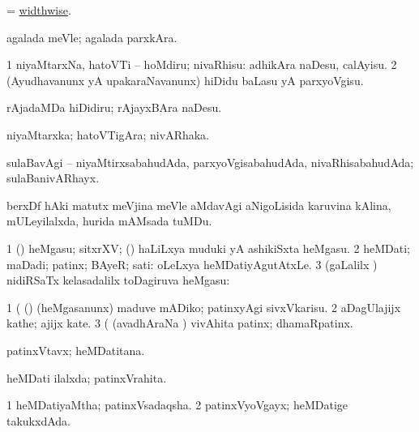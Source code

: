 \bentry
{}
\gl{\kirxvi}
\bmng
= \hyperlink{widthwise}{widthwise}. 
\emng
\eentry

\bentry
{}
\gl{\kirxvi}
\bmng
agalada meVle; agalada parxkAra. 
\emng
\eentry

\bentry
{}
\gl{\sakirx}
\bmng
\bnum
\num{1} niyaMtarxNa, hatoVTi -- hoMdiru; nivaRhisu:  adhikAra naDesu, calAyisu. 
\num{2} (Ayudhavanunx yA upakaraNavanunx) hiDidu baLasu yA parxyoVgisu. 
\enum
\emng

\noindent 
\gl{\pagu}
\bmng
{} rAjadaMDa hiDidiru; rAjayxBAra naDesu. 
\emng
\eentry

\bentry
{}
\gl{\nA}
\bmng
niyaMtarxka; hatoVTigAra; nivARhaka. 
\emng
\eentry

\bentry
{} 
\gl{\gu}
\bmng
sulaBavAgi -- niyaMtirxsabahudAda, parxyoVgisabahudAda, nivaRhisabahudAda; sulaBanivARhayx. 
\emng
\eentry

\bentry
{}
\gl{\nA}
\bmng
berxDf hAki matutx meVjina meVle aMdavAgi aNigoLisida karuvina kAlina, mULeyilalxda, hurida mAMsada tuMDu. 
\emng
\eentry

\bentry
{} 
\gl{\nA} 
\bmng
\bnum
\num{1} (\pArxparx) heMgasu; sitxrXV; (\kanmu) haLiLxya muduki yA ashikiSxta heMgasu. 
\num{2} heMDati; maDadi; patinx; BAyeR; sati:  oLeLxya heMDatiyAgutAtxLe. 
\num{3} (\saMpa gaLalilx \parx) nidiRSaTx kelasadalilx toDagiruva heMgasu:  
\enum
\emng

\noindent 
\gl{\pagu}
\bmng
\bnum
\num{1}  (  (\pArxparx) (heMgasanunx) maduve mADiko; patinxyAgi sivxVkarisu. 
\num{2}  aDagUlajijx kathe; ajijx kate. 
\num{3}  (  (avadhAraNa \parx) vivAhita patinx; dhamaRpatinx. 
\enum
\emng
\eentry

\bentry
{}
\gl{\nA}
\bmng
patinxVtavx; heMDatitana. 
\emng
\eentry

\bentry
{}
\gl{\gu}
\bmng
heMDati ilalxda; patinxVrahita. 
\emng
\eentry

\bentry
{} 
\gl{\gu}
\expl{}
\bmng
\bnum
\num{1} heMDatiyaMtha; patinxVsadaqsha. 
\num{2} patinxVyoVgayx; heMDatige takukxdAda. 
\enum
\emng
\eentry

